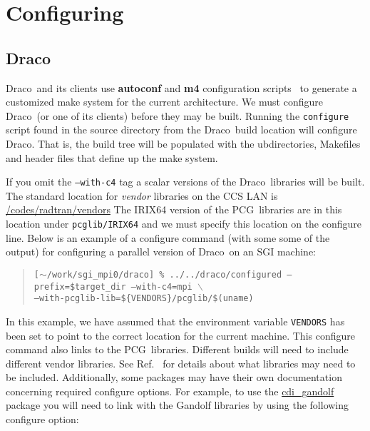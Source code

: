\documentclass[11pt]{nmemo}
\newcommand{\comp}[1]{\normalfont\footnotesize\texttt{#1}\normalsize}
\newcommand{\draco}{{\normalfont\sffamily Draco}}
\newcommand{\pcg}{{\normalfont\sffamily PCG}}
\begin{document}
\section{Configuring}
\label{configure}

\subsection{\draco}

\draco\ and its clients use \textbf{autoconf} and \textbf{m4}
configuration scripts~\cite{autoconf} to generate a customized make
system for the current architecture.  We must configure \draco\ (or
one of its clients) before they may be built.  Running the
\comp{configure} script found in the source directory from the \draco\ 
build location will configure \draco.  That is, the build tree will be
populated with the ubdirectories, Makefiles and header files that
define up the make system.  

If you omit the \comp{--with-c4} tag a scalar versions of the \draco\ 
libraries will be built.  The standard location for \emph{vendor}
libraries on the CCS LAN is \url{/codes/radtran/vendors} The IRIX64
version of the \pcg\ libraries are in this location under
\comp{pcglib/IRIX64} and we must specify this location on the
configure line.  Below is an example of a configure command (with some
some of the output) for configuring a parallel version of \draco\ on
an SGI machine:

\footnotesize
\begin{verse}
\texttt{[$\sim$/work/sgi\_mpi0/draco] \% ../../draco/configured --prefix=\${target\_dir} --with-c4=mpi $\backslash$\\
\hspace{0.5in}--with-pcglib-lib=\$\{VENDORS\}/pcglib/\$(uname)} \\
\end{verse}
\normalsize

In this example, we have assumed that the environment variable
\comp{VENDORS} has been set to point to the correct location for the
current machine. This configure command also links to the \pcg\ 
libraries.  Different builds will need to include different vendor
libraries.  See Ref.~\cite{draco-build} for details about what
libraries may need to be included.  Additionally, some packages may
have their own documentation concerning required configure options.
For example, to use the \url{cdi_gandolf} package you will need to
link with the Gandolf libraries by using the following configure
option:
\end{document}
